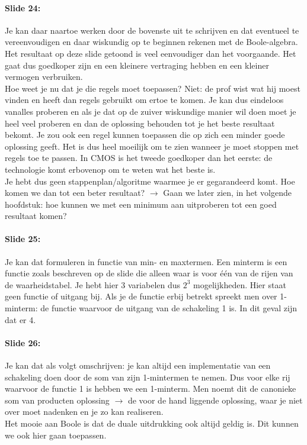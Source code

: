 \documentclass[10pt,a4paper]{book}
\begin{document}
\paragraph{Slide 24:} Je kan daar naartoe werken door de bovenste uit te schrijven en dat eventueel te vereenvoudigen en daar wiskundig op te beginnen rekenen met de Boole-algebra. Het resultaat op deze slide getoond is veel eenvoudiger dan het voorgaande. Het gaat dus goedkoper zijn en een kleinere vertraging hebben en een kleiner vermogen verbruiken.\\
Hoe weet je nu dat je die regels moet toepassen? Niet: de prof wist wat hij moest vinden en heeft dan regels gebruikt om ertoe te komen. Je kan dus eindeloos vanalles proberen en als je dat op de zuiver wiskundige manier wil doen moet je heel veel proberen en dan de oplossing behouden tot je het beste resultaat bekomt. Je zou ook een regel kunnen toepassen die op zich een minder goede oplossing geeft. Het is dus heel moeilijk om te zien wanneer je moet stoppen met regels toe te passen. In CMOS is het tweede goedkoper dan het eerste: de technologie komt erbovenop om te weten wat het beste is.\\
Je hebt dus geen stappenplan/algoritme waarmee je er gegarandeerd komt. Hoe komen we dan tot een beter resultaat? $\rightarrow$ Gaan we later zien, in het volgende hoofdstuk: hoe kunnen we met een minimum aan uitproberen tot een goed resultaat komen?

\paragraph{Slide 25:} Je kan dat formuleren in functie van min- en maxtermen. Een minterm is een functie zoals beschreven op de slide die alleen waar is voor \'e\'en van de rijen van de waarheidstabel. Je hebt hier 3 variabelen dus $2^3$ mogelijkheden. Hier staat geen functie of uitgang bij. Als je de functie erbij betrekt spreekt men over 1-minterm: de functie waarvoor de uitgang van de schakeling 1 is. In dit geval zijn dat er 4. 

\paragraph{Slide 26:} Je kan dat als volgt omschrijven: je kan altijd een implementatie van een schakeling doen door de som van zijn 1-mintermen te nemen. Dus voor elke rij waarvoor de functie 1 is hebben we een 1-minterm. Men noemt dit de canonieke som van producten oplossing $\rightarrow$ de voor de hand liggende oplossing, waar je niet over moet nadenken en je zo kan realiseren.\\
Het mooie aan Boole is dat de duale uitdrukking ook altijd geldig is. Dit kunnen we ook hier gaan toepassen.
\end{document}

